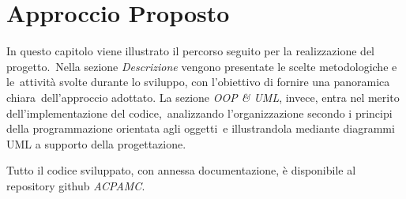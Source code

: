 \chapter{Approccio Proposto}

In questo capitolo viene illustrato il percorso seguito per la realizzazione del progetto.\
Nella sezione \textit{Descrizione} vengono presentate le scelte metodologiche e le\
attività svolte durante lo sviluppo, con l'obiettivo di fornire una panoramica chiara\
dell'approccio adottato. La sezione \textit{OOP \& UML}, invece, entra nel merito dell'implementazione del codice,\
analizzando l'organizzazione secondo i principi della programmazione orientata agli oggetti\
e illustrandola mediante diagrammi UML a supporto della progettazione.

Tutto il codice sviluppato, con annessa documentazione, è disponibile al repository github \textit{ACPAMC}.



